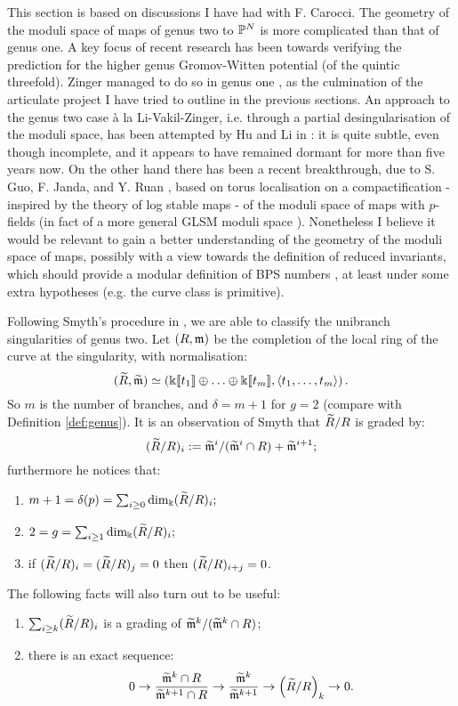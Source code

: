 This section is based on discussions I have had with F. Carocci. The geometry of the moduli space of maps of genus two to $\mathbb P^N$ is more complicated than that of genus one. A key focus of recent research has been towards verifying the \cite{BCOV} prediction for the higher genus Gromov-Witten potential (of the quintic threefold). Zinger managed to do so in genus one \cite{Zinger-CYhyp}, as the culmination of the articulate project I have tried to outline in the previous sections. An approach to the genus two case \`a la Li-Vakil-Zinger, i.e. through a partial desingularisation of the moduli space, has been attempted by Hu and Li in \cite{HL2}: it is quite subtle, even though incomplete, and it appears to have remained dormant for more than five years now. On the other hand there has been a recent breakthrough, due to S. Guo, F. Janda, and Y. Ruan \cite{GJR}, based on torus localisation on a compactification - inspired by the theory of log stable maps - of the moduli space of maps with $p$-fields (in fact of a more general GLSM moduli space \cite{CJRS}). Nonetheless I believe it would be relevant to gain a better understanding of the geometry of the moduli space of maps, possibly with a view towards the definition of reduced invariants, which should provide a modular definition of BPS numbers \cite{PandhaHodge}, at least under some extra hypotheses (e.g. the curve class is primitive).

Following Smyth's procedure in \cite[Appendix A]{SMY1}, we are able to classify the unibranch singularities of genus two. Let $(R,\mathfrak m)$ be the completion of the local ring of the curve at the singularity, with normalisation:
\[(\widetilde{R},\widetilde{\mathfrak m})\simeq\left(\Bbbk[\![t_1]\!]\oplus\ldots\oplus\Bbbk[\![t_m]\!],\langle t_1,\ldots,t_m\rangle\right).\]
So $m$ is the number of branches, and $\delta=m+1$ for $g=2$ (compare with Definition \ref{def:genus}). It is an observation of Smyth that $\widetilde{R}/R$ is graded by:
\[ (\widetilde{R}/R)_i:=\widetilde{\mathfrak m}^i/(\widetilde{\mathfrak m}^i\cap R)+\widetilde{\mathfrak m}^{i+1};\]
furthermore he notices that:
\begin{enumerate}
\item $m+1=\delta(p)=\sum_{i\geq 0}\dim_\Bbbk(\widetilde{R}/R)_i;$
\item $2=g=\sum_{i\geq 1}\dim_\Bbbk(\widetilde{R}/R)_i;$
\item if $(\widetilde{R}/R)_i=(\widetilde{R}/R)_j=0$ then $(\widetilde{R}/R)_{i+j}=0$.
\end{enumerate}
The following facts will also turn out to be useful:
\begin{enumerate}[resume]
 \item $\sum_{i\geq k}(\widetilde{R}/R)_i$ is a grading of $\widetilde{\mathfrak m}^k/(\widetilde{\mathfrak m}^k\cap R)$;
 \item there is an exact sequence:
 \[ 0\rightarrow \frac{\widetilde{\mathfrak m}^k\cap R}{\widetilde{\mathfrak m}^{k+1}\cap R}\rightarrow \frac{\widetilde{\mathfrak m}^k}{\widetilde{\mathfrak m}^{k+1}}\rightarrow \left(\widetilde{R}/R\right)_k\rightarrow 0.\]
\end{enumerate}

